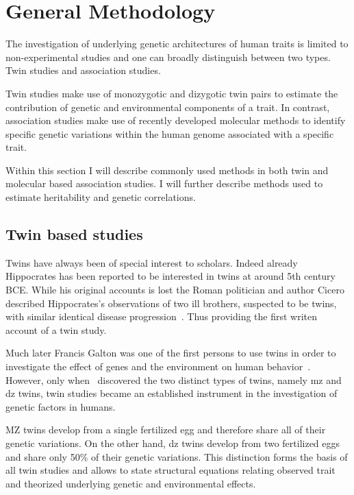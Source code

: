 \documentclass[../header.tex]{subfiles}
\begin{document}
\chapter{General Methodology}
\label{cha:methods_applied_in_genetic_studies_on_humans}

The investigation of underlying genetic architectures of human traits is limited to non-experimental studies and one can broadly distinguish between two types.
Twin studies and association studies.

Twin studies make use of monozygotic and dizygotic twin pairs to estimate the contribution of genetic and environmental components of a trait.
In contrast, association studies make use of recently developed molecular methods to identify specific genetic variations within the human genome associated with a specific trait.

Within this section I will describe commonly used methods in both twin and molecular based association studies.
I will further describe methods used to estimate heritability and genetic correlations.

\section{Twin based studies}
\label{sec:twin_based_studies}

Twins have always been of special interest to scholars.
Indeed already Hippocrates has been reported to be interested in twins at around 5th century BCE\@.
While his original accounts is lost the Roman politician and author Cicero described Hippocrates's observations of two ill brothers, suspected to be twins, with similar identical disease progression~\cite{Cicero44BC}.
Thus providing the first writen account of a twin study.

Much later Francis Galton was one of the first persons to use twins in order to investigate the effect of genes and the environment on human behavior~\cite{Rende1990}.
However, only when~\citet{Simens1924} discovered the two distinct types of twins, namely \acrfull{mz} and \acrfull{dz} twins, twin studies became an established instrument in the investigation of genetic factors in humans.

MZ twins develop from a single fertilized egg and therefore share all of their genetic variations.
On the other hand, \acrfull{dz} twins develop from two fertilized eggs and share only 50\% of their genetic variations.
This distinction forms the basis of all twin studies and allows to state structural equations relating observed trait and theorized underlying genetic and environmental effects.
\end{document}
